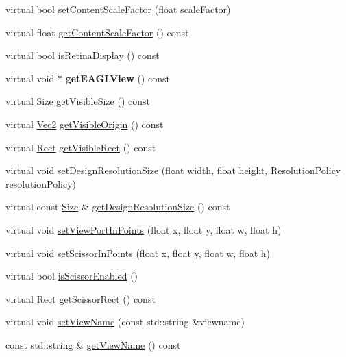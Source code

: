 \begin{DoxyCompactItemize}
virtual bool \hyperlink{classGLView_a40714c1d078f964bb51d12228af98054}{set\+Content\+Scale\+Factor} (float scale\+Factor)
\item 
virtual float \hyperlink{classGLView_a730b2ced5ee33d2bf975eb3fffd317bf}{get\+Content\+Scale\+Factor} () const
\item 
virtual bool \hyperlink{classGLView_a6b51811c80d053326246f2f318010edc}{is\+Retina\+Display} () const
\item 
\mbox{\label{classGLView_a5b0d14981b3b688a747a194c87bbe9a0}} 
virtual void $\ast$ {\bfseries get\+E\+A\+G\+L\+View} () const
\item 
virtual \hyperlink{classSize}{Size} \hyperlink{classGLView_a0f947fc229b184153cb67e9437244c7b}{get\+Visible\+Size} () const
\item 
virtual \hyperlink{classVec2}{Vec2} \hyperlink{classGLView_ad9dd07f5472dc82f3ae71988401bcd81}{get\+Visible\+Origin} () const
\item 
virtual \hyperlink{classRect}{Rect} \hyperlink{classGLView_a72ed119a20fd0dfe89890770c2824cd3}{get\+Visible\+Rect} () const
\item 
virtual void \hyperlink{classGLView_a754e253a506c4eb9a923a2a33b4b955c}{set\+Design\+Resolution\+Size} (float width, float height, Resolution\+Policy resolution\+Policy)
\item 
virtual const \hyperlink{classSize}{Size} \& \hyperlink{classGLView_a002c77306c0ee47cbf17c05bbfec3a7f}{get\+Design\+Resolution\+Size} () const
\item 
virtual void \hyperlink{classGLView_ab19f26fc6123c51f48c2852b059eb676}{set\+View\+Port\+In\+Points} (float x, float y, float w, float h)
\item 
virtual void \hyperlink{classGLView_a92dd9d0d58e97aeb5cb236f8155b9040}{set\+Scissor\+In\+Points} (float x, float y, float w, float h)
\item 
virtual bool \hyperlink{classGLView_a0dccbd245a5f49590693fd46a55d322d}{is\+Scissor\+Enabled} ()
\item 
virtual \hyperlink{classRect}{Rect} \hyperlink{classGLView_a83917d65d7b496a031bfa7a7516c319c}{get\+Scissor\+Rect} () const
\item 
virtual void \hyperlink{classGLView_abc3a9132adea8262abaa85dc4f63830f}{set\+View\+Name} (const std\+::string \&viewname)
\item 
const std\+::string \& \hyperlink{classGLView_a71162616a3fcb442b640c0ef9efe6a42}{get\+View\+Name} () const
\item 

\end{DoxyCompactItemize}
